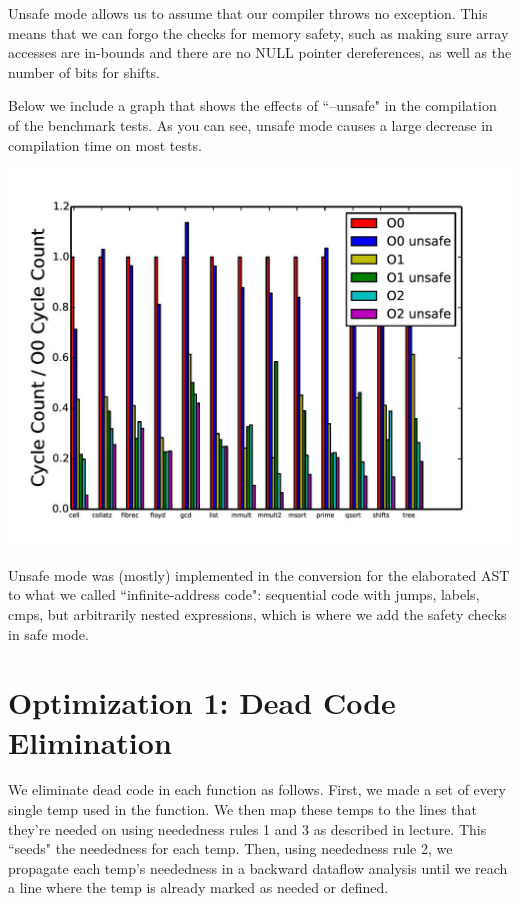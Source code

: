 \documentclass{article}
\begin{document}
Unsafe mode allows us to assume that our compiler throws no exception. This means that we can forgo the checks for memory safety, such as making sure array accesses are in-bounds and there are no NULL pointer dereferences, as well as the number of bits for shifts. 

Below we include a graph that shows the effects of ``--unsafe" in the compilation of the benchmark tests. As you can see, unsafe mode causes a large decrease in compilation time on most tests. 

\includegraphics[scale=0.5]{everything-page-001}

Unsafe mode was (mostly) implemented in the conversion for the elaborated AST to what we called ``infinite-address code": sequential code with jumps, labels, cmps, but arbitrarily nested expressions, which is where we add the safety checks in safe mode.

\section{Optimization 1: Dead Code Elimination}

We eliminate dead code in each function as follows. First, we made a set of every single temp used in the function. We then map these temps to the lines that they're needed on using neededness rules 1 and 3 as described in lecture. This ``seeds" the neededness for each temp. Then, using neededness rule 2, we propagate each temp's neededness in a backward dataflow analysis until we reach a line where the temp is already marked as needed or defined. 
\end{document}

